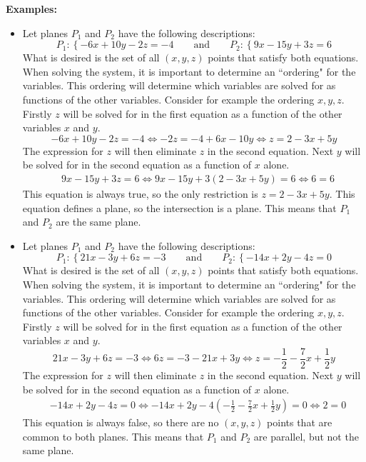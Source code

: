 \documentclass{article}
\begin{document}
\textbf{Examples:}
\begin{itemize}
\item Let planes \(P_1\) and \(P_2\) have the following descriptions:
\[P_1 : \left\{-6x + 10y - 2z = -4\right. \quad\quad\text{and}\quad\quad P_2 : \left\{9x - 15y + 3z = 6\right.\]
What is desired is the set of all \((x,y,z)\) points that satisfy both equations. When solving the system, it is important to determine an ``ordering" for the variables. This ordering will determine which variables are solved for as functions of the other variables. Consider for example the ordering \(x, y, z\). Firstly \(z\) will be solved for in the first equation as a function of the other variables \(x\) and \(y\). 
\[-6x + 10y - 2z = -4 \iff -2z = -4 + 6x - 10y \iff z = 2 - 3x + 5y\]
The expression for \(z\) will then eliminate \(z\) in the second equation. Next \(y\) will be solved for in the second equation as a function of \(x\) alone. 
\begin{align*}
& 9x - 15y + 3z = 6 
\iff 9x - 15y + 3(2 - 3x + 5y) = 6 
\iff 6 = 6 
\end{align*}
This equation is always true, so the only restriction is \(z = 2 - 3x + 5y\). This equation defines a plane, so the intersection is a plane. This means that \(P_1\) and \(P_2\) are the same plane. 
\item Let planes \(P_1\) and \(P_2\) have the following descriptions:
\[P_1 : \left\{21x - 3y + 6z = -3\right. \quad\quad\text{and}\quad\quad P_2 : \left\{-14x + 2y - 4z = 0\right.\]
What is desired is the set of all \((x,y,z)\) points that satisfy both equations. When solving the system, it is important to determine an ``ordering" for the variables. This ordering will determine which variables are solved for as functions of the other variables. Consider for example the ordering \(x, y, z\). Firstly \(z\) will be solved for in the first equation as a function of the other variables \(x\) and \(y\). 
\[21x - 3y + 6z = -3 \iff 6z = -3 - 21x + 3y \iff z = -\frac{1}{2} - \frac{7}{2}x + \frac{1}{2}y\]
The expression for \(z\) will then eliminate \(z\) in the second equation. Next \(y\) will be solved for in the second equation as a function of \(x\) alone. 
\begin{align*}
& -14x + 2y - 4z = 0  
\iff -14x + 2y - 4(-\frac{1}{2} - \frac{7}{2}x + \frac{1}{2}y) = 0  
\iff 2 = 0 
\end{align*}
This equation is always false, so there are no \((x, y, z)\) points that are common to both planes. This means that \(P_1\) and \(P_2\) are parallel, but not the same plane. 
\end{itemize}
\end{document}
